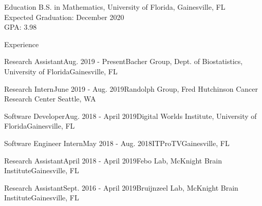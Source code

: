 \documentclass{resume}
\begin{document}
 
 
\begin{rSection}{Education} 
B.S. in Mathematics, University of Florida, Gainesville, FL \\
Expected Graduation: December 2020 \\
GPA: 3.98

\end{rSection}


\begin{rSection}{Experience}

\begin{rSubsectionEmpty}{Research Assistant}{Aug. 2019 - Present}{Bacher Group, Dept. of
Biostatistics, University of Florida}{Gainesville, FL}
\end{rSubsectionEmpty}

\begin{rSubsectionEmpty}{Research Intern}{June 2019 - Aug. 2019}{Randolph
    Group, Fred Hutchinson Cancer Research Center}
{Seattle, WA}
\end{rSubsectionEmpty}

\begin{rSubsectionEmpty}{Software Developer}{Aug. 2018 - April 2019}{Digital Worlds Institute, University of Florida}{Gainesville, FL}
\end{rSubsectionEmpty}

\begin{rSubsectionEmpty}{Software Engineer Intern}{May 2018 - Aug. 2018}{ITProTV}{Gainesville, FL}
\end{rSubsectionEmpty} 

\begin{rSubsectionEmpty}{Research Assistant}{April 2018 - April 2019}{Febo Lab, McKnight Brain Institute}{Gainesville, FL}
\end{rSubsectionEmpty}


\begin{rSubsectionEmpty}{Research Assistant}{Sept. 2016 - April 2019}{Bruijnzeel Lab, McKnight Brain Institute}{Gainesville, FL}
     \end{rSubsectionEmpty}
     
\end{rSection}
\end{document}
